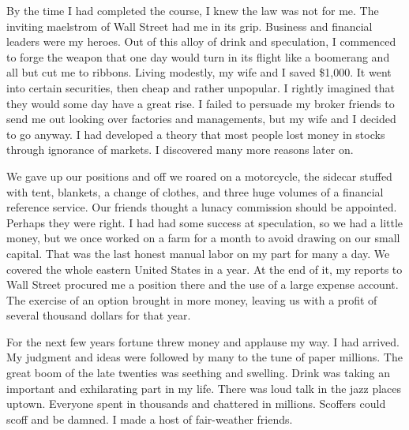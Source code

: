 \begin{biblechapter}
\verse By the time I had completed the course, 
    I knew the law was not for me.
\verse The inviting maelstrom of Wall Street had me in its grip.
\verse Business and financial leaders were my heroes.
\verse Out of this alloy of drink and speculation, 
    I commenced to forge the weapon that one day would turn in its flight 
    like a boomerang and all but cut me to ribbons.
\verse Living modestly, my wife and I saved \$1,000.
\verse It went into certain securities, then cheap and rather unpopular.
\verse I rightly imagined that they would some day have a great rise.
\verse I failed to persuade my broker friends to send me out looking over factories and managements, 
    but my wife and I decided to go anyway.
\verse I had developed a theory that most people lost money in stocks through ignorance of markets.
\verse I discovered many more reasons later on.

\verse We gave up our positions and off we roared on a motorcycle, 
    the sidecar stuffed with tent, blankets, a change of clothes, 
    and three huge volumes of a financial reference service.
\verse Our friends thought a lunacy commission should be appointed.
\verse Perhaps they were right.
\verse I had had some success at speculation, 
    so we had a little money, 
    but we once worked on a farm for a month to avoid drawing on our small capital.
\verse That was the last honest manual labor on my part for many a day.
\verse We covered the whole eastern United States in a year.
\verse At the end of it, 
    my reports to Wall Street procured me a position there 
    and the use of a large expense account.
\verse The exercise of an option brought in more money, 
    leaving us with a profit of several thousand dollars for that year.

\verse For the next few years fortune threw money and applause my way.
\verse I had arrived.
\verse My judgment and ideas were followed by many to the tune of paper millions.
\verse The great boom of the late twenties was seething and swelling.
\verse Drink was taking an important and exhilarating part in my life.
\verse There was loud talk in the jazz places uptown.
\verse Everyone spent in thousands and chattered in millions.
\verse Scoffers could scoff and be damned.
\verse I made a host of fair-weather friends.
\end{biblechapter}


